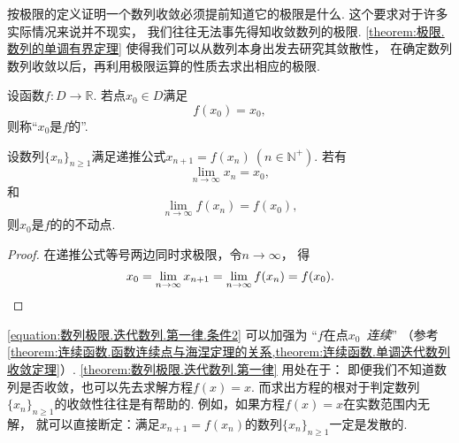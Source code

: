 按极限的定义证明一个数列收敛必须提前知道它的极限是什么.
这个要求对于许多实际情况来说并不现实，
我们往往无法事先得知收敛数列的极限.
\cref{theorem:极限.数列的单调有界定理} 使得我们可以从数列本身出发去研究其敛散性，
在确定数列数列收敛以后，再利用极限运算的性质去求出相应的极限.

\begin{definition}
设函数\(f\colon D\to\mathbb{R}\).
若点\(x_0 \in D\)满足\[
	f(x_0) = x_0,
\]
则称“\(x_0\)是\(f\)的”.
\end{definition}
\begin{proposition}\label{theorem:数列极限.迭代数列.第一律}
设数列\(\{x_n\}_{n\geq1}\)满足递推公式\(x_{n+1} = f(x_n)\ (n\in\mathbb{N}^+)\).
若有\[%
	\lim_{n\to\infty} x_n = x_0,
\]和\begin{equation}\label{equation:数列极限.迭代数列.第一律.条件2}
	\lim_{n\to\infty} f(x_n) = f(x_0),
\end{equation}
则\(x_0\)是\(f\)的的不动点.
\begin{proof}
在递推公式等号两边同时求极限，令\(n\to\infty\)，
得\[
	x_0 = \lim_{n\to\infty} x_{n+1} = \lim_{n\to\infty} f(x_n) = f(x_0).
	\qedhere
\]
\end{proof}
\end{proposition}
\begin{remark}
\cref{equation:数列极限.迭代数列.第一律.条件2} 可以加强为
“\(f\)在点\(x_0\)~\emph{连续}”
（参考\cref{theorem:连续函数.函数连续点与海涅定理的关系,theorem:连续函数.单调迭代数列收敛定理}）.
\cref{theorem:数列极限.迭代数列.第一律} 用处在于：
即便我们不知道数列是否收敛，也可以先去求解方程\(f(x) = x\).
而求出方程的根对于判定数列\(\{x_n\}_{n\geq1}\)的收敛性往往是有帮助的.
例如，如果方程\(f(x) = x\)在实数范围内无解，
就可以直接断定：满足\(x_{n+1} = f(x_n)\)的数列\(\{x_n\}_{n\geq1}\)一定是发散的.
\end{remark}

